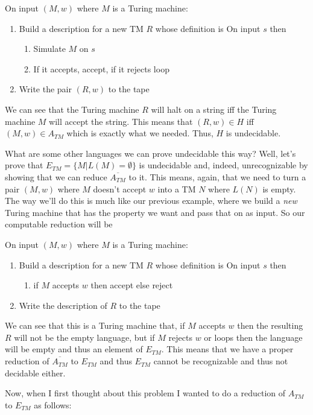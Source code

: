 \documentclass[11pt]{article}
\begin{document}
On input $(M,w)$ where $M$ is a Turing machine: 
\begin{enumerate}
\item Build a description for a new TM $R$ whose definition is
On input $s$ then 
\begin{enumerate}
\item Simulate $M$ on $s$
\item If it accepts, accept, if it rejects loop
\end{enumerate}
\item Write the pair $(R,w)$ to the tape
\end{enumerate}

We can see that the Turing machine $R$ will halt on a string iff the Turing machine $M$ will accept the string. This means that $(R,w) \in H$ iff $(M,w) \in A_{TM}$ which is exactly what we needed. Thus, $H$ is undecidable. 

What are some other languages we can prove undecidable this way? Well, let's prove that $E_{TM} = \{ M | L(M) = \emptyset \}$ is undecidable and, indeed, unrecognizable by showing that we can reduce $\overline{A_{TM}}$ to it. This means, again, that we need to turn a pair $(M,w)$ where $M$ doesn't accept $w$ into a TM $N$ where $L(N)$ is empty. The way we'll do this is much like our previous example, where we build a \emph{new} Turing machine that has the property we want and pass that on as input. So our computable reduction will be

On input $(M,w)$ where $M$ is a Turing machine: 
\begin{enumerate}
\item Build a description for a new TM $R$ whose definition is
On input $s$ then 
\begin{enumerate}
\item if $M$ accepts $w$ then accept else reject
\end{enumerate}
\item Write the description of $R$ to the tape
\end{enumerate}

We can see that this is a Turing machine that, if $M$ accepts $w$ then the resulting $R$ will not be the empty language, but if $M$ rejects $w$ or loops then the language will be empty and thus an element of $E_{TM}$. This means that we have a proper reduction of $\overline{A_{TM}}$ to $E_{TM}$ and thus $E_{TM}$ cannot be recognizable and thus not decidable either. 

Now, when I first thought about this problem I wanted to do a reduction of $A_{TM}$ to $E_{TM}$ as follows: 
\end{document}
